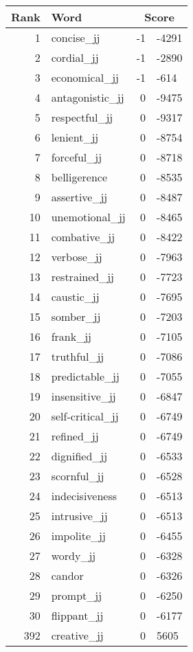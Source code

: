 \begin{longtable}[!htbp]{| rlr@{.}l |}
    \hline
    \textbf{Rank} & \textbf{Word} & \multicolumn{2}{c|}{\textbf{Score}} \\
    \hline
    \endhead
    1 & concise\_jj & -1 & -4291 \\
    2 & cordial\_jj & -1 & -2890 \\
    3 & economical\_jj & -1 & -614 \\
    4 & antagonistic\_jj & 0 & -9475 \\
    5 & respectful\_jj & 0 & -9317 \\
    6 & lenient\_jj & 0 & -8754 \\
    7 & forceful\_jj & 0 & -8718 \\
    8 & belligerence & 0 & -8535 \\
    9 & assertive\_jj & 0 & -8487 \\
    10 & unemotional\_jj & 0 & -8465 \\
    11 & combative\_jj & 0 & -8422 \\
    12 & verbose\_jj & 0 & -7963 \\
    13 & restrained\_jj & 0 & -7723 \\
    14 & caustic\_jj & 0 & -7695 \\
    15 & somber\_jj & 0 & -7203 \\
    16 & frank\_jj & 0 & -7105 \\
    17 & truthful\_jj & 0 & -7086 \\
    18 & predictable\_jj & 0 & -7055 \\
    19 & insensitive\_jj & 0 & -6847 \\
    20 & self-critical\_jj & 0 & -6749 \\
    21 & refined\_jj & 0 & -6749 \\
    22 & dignified\_jj & 0 & -6533 \\
    23 & scornful\_jj & 0 & -6528 \\
    24 & indecisiveness & 0 & -6513 \\
    25 & intrusive\_jj & 0 & -6513 \\
    26 & impolite\_jj & 0 & -6455 \\
    27 & wordy\_jj & 0 & -6328 \\
    28 & candor & 0 & -6326 \\
    29 & prompt\_jj & 0 & -6250 \\
    30 & flippant\_jj & 0 & -6177 \\
    392 & creative\_jj & 0 & 5605 \\

\end{longtable}
